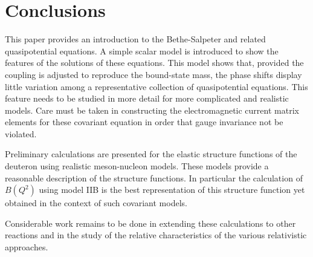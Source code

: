 \documentclass[mythesis.tex]{subfiles}
\begin{document}
\setcounter{chapter}{4}
\chapter{Conclusions}

This paper provides an introduction to the Bethe-Salpeter and related
quasipotential equations. A simple scalar model is introduced to show the
features of the solutions of these equations. This model shows that,
provided the coupling is adjusted to reproduce the bound-state mass, the
phase shifts display little variation among a representative collection
of quasipotential equations. This feature needs to be studied in more
detail for more complicated and realistic models. Care must be taken in
constructing the electromagnetic current matrix elements for these covariant
equation in order that gauge invariance not be violated.

Preliminary calculations are presented for the elastic structure functions
of the deuteron using realistic meson-nucleon models. These models provide
a reasonable description of the structure functions. In particular the
calculation of $B(Q^2)$ using model IIB is the best representation of this
structure function yet obtained in the context of such covariant models.

Considerable work remains to be done in extending these calculations to
other reactions and in the study of the relative characteristics of the
various relativistic approaches.
\end{document}
